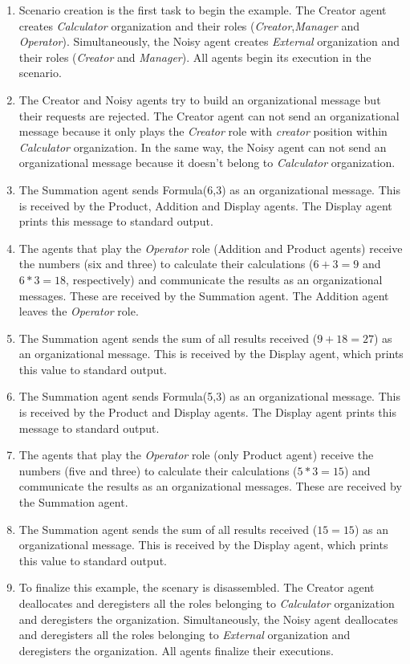 \begin{enumerate}
\item Scenario creation is the first task to begin the example. The Creator agent creates \textit{Calculator}
  organization and their roles (\textit{Creator},\textit{Manager} and \textit{Operator}). Simultaneously,
  the Noisy agent creates \textit{External} organization and their roles (\textit{Creator} and \textit{Manager}).
  All agents begin its execution in the scenario.
\item The Creator and Noisy agents try to build an organizational message but their requests are rejected.
  The Creator agent can not send an organizational message because it only plays the \textit{Creator}
  role with \textit{creator} position within \textit{Calculator} organization. In the same way, the Noisy
  agent can not send an organizational message because it doesn't belong to \textit{Calculator} organization.
\item The Summation agent sends Formula(6,3) as an organizational message. This is received by the Product,
  Addition and Display agents. The Display agent prints this message to standard output.
\item The agents that play the \textit{Operator} role (Addition and Product agents) receive the numbers
  (six and three) to calculate their calculations ($6+3=9$ and $6*3=18$, respectively) and communicate
  the results as an organizational messages. These are received by the Summation agent. The Addition agent
  leaves the \textit{Operator} role.
\item The Summation agent sends the sum of all results received ($9+18=27$) as an organizational message.
  This is received by the Display agent, which prints this value to standard output.
\item The Summation agent sends Formula(5,3) as an organizational message. This is received by the Product
  and Display agents. The Display agent prints this message to standard output.
\item The agents that play the \textit{Operator} role (only Product agent) receive the numbers (five and three)
  to calculate their calculations ($5*3=15$) and communicate the results as an organizational messages. These
  are received by the Summation agent.
\item The Summation agent sends the sum of all results received ($15=15$) as an organizational message. This
  is received by the Display agent, which prints this value to standard output.
\item To finalize this example, the scenary is disassembled. The Creator agent deallocates and deregisters
  all the roles belonging to \textit{Calculator} organization and deregisters the organization. Simultaneously,
  the Noisy agent deallocates and deregisters all the roles belonging to \textit{External} organization and
  deregisters the organization. All agents finalize their executions.
\end{enumerate}


